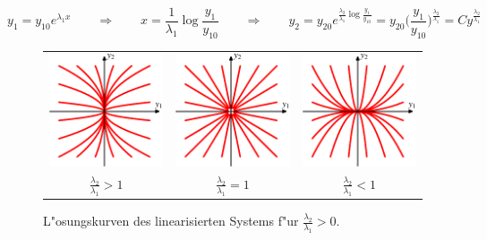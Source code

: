\[
y_1=y_{10} e^{\lambda_1 x}
\qquad\Rightarrow\qquad
x=\frac1{\lambda_1}\log\frac{y_1}{y_{10}}
\qquad\Rightarrow\qquad
y_2
=
y_{20} e^{\frac{\lambda_2}{\lambda_1}\log\frac{y_1}{y_{10}}}
=
y_{20}\biggl(\frac{y_1}{y_{10}}\biggr)^{\frac{\lambda_2}{\lambda_1}}
=
Cy^{\frac{\lambda_2}{\lambda_1}}
\]
\begin{figure}
\centering
\begin{tabular}{ccc}
\includegraphics{chapters/images/geometrie-2.pdf}&%
\includegraphics{chapters/images/geometrie-3.pdf}&%
\includegraphics{chapters/images/geometrie-4.pdf}\\
$\displaystyle \frac{\lambda_2}{\lambda_1}>1$&%
$\displaystyle \frac{\lambda_2}{\lambda_1}=1$&%
$\displaystyle \frac{\lambda_2}{\lambda_1}<1$
\end{tabular}
\caption{L"osungskurven des linearisierten Systems f"ur
$\frac{\lambda_2}{\lambda_1}>0$.
\label{geometrie:posportraits}}
\end{figure}

